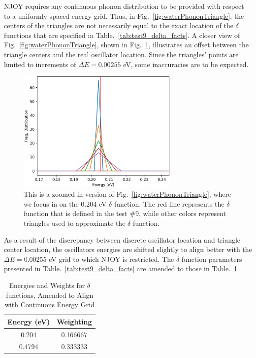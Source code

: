 \documentclass[Master.tex]{subfiles}
\begin{document}
    NJOY requires any continuous phonon distribution to be provided with respect to a uniformly-spaced energy grid. Thus, in Fig.~\ref{fig:waterPhononTriangle}, the centers of the triangles are not necessarily equal to the exact location of the $\delta$ functions that are specified in Table.~\ref{tab:test9_delta_facts}. A closer view of Fig.~\ref{fig:waterPhononTriangle}, shown in Fig.~\ref{fig:waterPhononTriangleZoomed}, illustrates an offset between the triangle centers and the real oscillator location. Since the triangles' points are limited to increments of $\Delta E=0.00255$ eV, some inaccuracies are to be expected.

    \begin{figure}[h]
      \begin{center}
        \includegraphics[width=0.7\textwidth]{waterPhononDistTrianglesZoomedb}
        \caption[Close-up of various triangles approximating 0.204 eV $\delta$ function]{This is a zoomed in version of Fig.~\ref{fig:waterPhononTriangle}, where we focus in on the 0.204 eV $\delta$ function. The red line represents the $\delta$ function that is defined in the test \#9, while other colors represent triangles used to approximate the $\delta$ function.}
        \label{fig:waterPhononTriangleZoomed}
      \end{center}
    \end{figure}
    As a result of the discrepancy between discrete oscillator location and triangle center location, the oscillators energies are shifted slightly to align better with the $\Delta E=0.00255$ eV grid to which NJOY is restricted. The $\delta$ function parameters presented in Table.~\ref{tab:test9_delta_facts} are amended to those in Table.~\ref{tab:amended_delta_facts}



    \begin{table}[H]
      \centering
      \caption[Energies and Weights for $\delta$ functions, Amended to Align with Continuous Energy Grid]{Energies and Weights for $\delta$ functions, Amended to Align with Continuous Energy Grid}
      \label{tab:amended_delta_facts}
      \begin{tabular}{ |c|c| }\hline
        Energy (eV)& Weighting\\\hline
        0.204& 0.166667\\\hline
        0.4794 & 0.333333 \\\hline
      \end{tabular}\\[1ex]
    \end{table}
\end{document}
